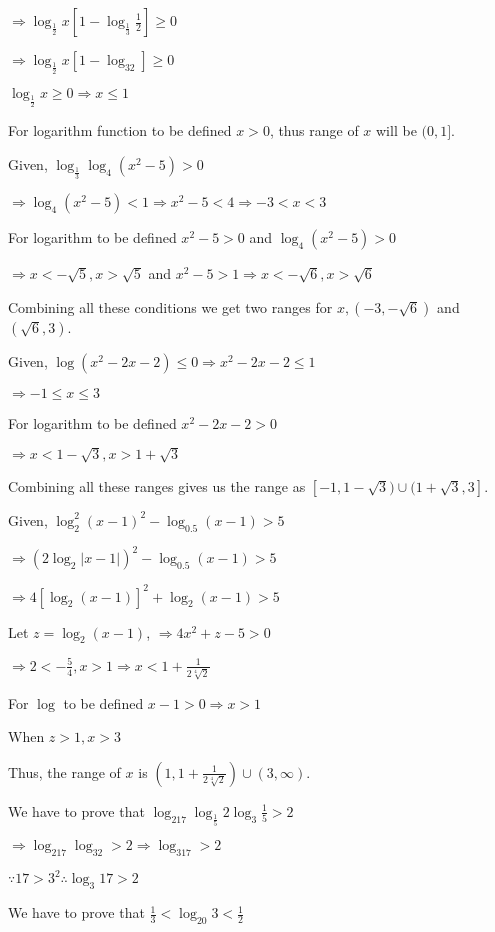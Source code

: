   $\Rightarrow \log_{\tfrac{1}{2}}x\left[1 - \log_{\tfrac{1}{3}}\frac{1}{2}\right]\geq 0$

  $\Rightarrow \log_{\tfrac{1}{2}}x[1 - \log_32]\geq 0$

  $\log_{\tfrac{1}{2}}x \geq 0 \Rightarrow x\leq 1$

  For logarithm function to be defined $x > 0$, thus range of $x$ will be $(0, 1]$.
\item Given, $\log_{\tfrac{1}{3}}\log_4(x^2 - 5) > 0$

  $\Rightarrow \log_4(x^2 - 5) < 1 \Rightarrow x^2 - 5 < 4 \Rightarrow -3 < x < 3$

  For logarithm to be defined $x^2 - 5 > 0$ and $\log_4(x^2 - 5) > 0$

  $\Rightarrow x < -\sqrt{5}, x > \sqrt{5}$ and $x^2 - 5 > 1 \Rightarrow x < -\sqrt{6}, x > \sqrt{6}$

  Combining all these conditions we get two ranges for $x, (-3, -\sqrt{6})$ and $(\sqrt{6}, 3)$.
\item Given, $\log(x^2 -2x -2)\leq 0 \Rightarrow x^2 - 2x - 2 \leq 1$

  $\Rightarrow -1\leq x \leq 3$

  For logarithm to be defined $x^2 - 2x - 2 > 0$

  $\Rightarrow x < 1 - \sqrt{3}, x > 1 + \sqrt{3}$

  Combining all these ranges gives us the range as $[-1, 1-\sqrt{3})\cup(1 + \sqrt{3}, 3]$.
\item Given, $\log_2^2(x-1)^2 - \log_{0.5}(x - 1) > 5$

  $\Rightarrow (2\log_2|x - 1|)^2 - \log_{0.5}(x - 1) > 5$

  $\Rightarrow 4[\log_2(x - 1)]^2 + \log_2(x - 1) > 5$

  Let $z = \log_2(x - 1)$, $\Rightarrow 4x^2 + z - 5 > 0$

  $\Rightarrow 2 < -\frac{5}{4}, x > 1 \Rightarrow x < 1 + \frac{1}{2\sqrt[4]{2}}$

  For $\log$ to be defined $x -1 > 0 \Rightarrow x > 1$

  When $z > 1, x > 3$

  Thus, the range of $x$ is $\left(1, 1 + \frac{1}{2\sqrt[4]{2}}\right)\cup (3, \infty)$.
\item We have to prove that $\log_217\log_{\tfrac{1}{5}}2\log_3\tfrac{1}{5} > 2$

  $\Rightarrow \log_217\log_32 > 2 \Rightarrow \log_317 > 2$

  $\because 17 > 3^2 \therefore \log_3{17} > 2$
\item We have to prove that $\frac{1}{3} < \log_{20}3 < \frac{1}{2}$

